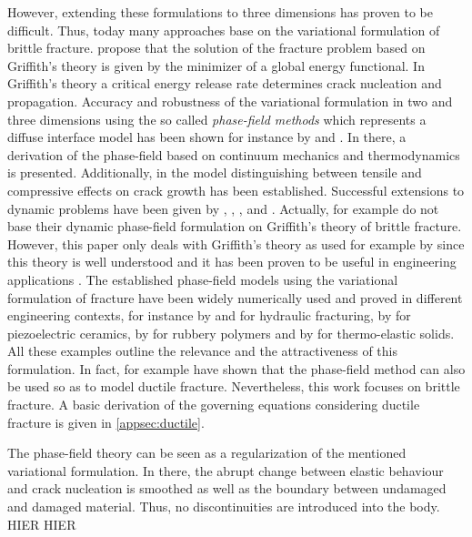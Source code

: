 However, extending these formulations to three dimensions has proven to be difficult. Thus, today many approaches base on the variational formulation of brittle fracture. \citet{02_B_VarBrittle} propose that the solution of the fracture problem based on Griffith's theory is given by the minimizer of a global energy functional. In Griffith's theory a critical energy release rate determines crack nucleation and propagation. Accuracy and robustness of the variational formulation in two and three dimensions using the so called \textit{phase-field methods} which represents a diffuse interface model has been shown for instance by \citet{04_B_VarBrittleProve2} and \citet{03_B_VarBrittleProve1}. In there, a derivation of the phase-field based on continuum mechanics and thermodynamics is presented. Additionally, in \cite{04_B_VarBrittleProve2} the model distinguishing between tensile and compressive effects on crack growth has been established. Successful extensions to dynamic problems have been given by \citet{01_PF_dyn_brittle}, \citet{05_B_dynExtension1}, \citet{06_B_dynExtension2}, \citet{07_B_dynExtension3} and \citet{08_B_dynExtension4}. Actually, for example \citet{10_PH_Mode3} do not base their dynamic phase-field formulation on Griffith's theory of brittle fracture. However, this paper only deals with Griffith's theory as used for example by \citet{08_PF_Gammac2} since this theory is well understood and it has been proven to be useful in engineering applications \citep{01_PF_dyn_brittle}. The established phase-field models using the variational formulation of fracture have been widely numerically used and proved in different engineering contexts, for instance by \citet{11_B_EngProb1} and \citet{12_B_EngProb2} for hydraulic fracturing, by \citet{13_B_EngProb3} for piezoelectric ceramics, by \citet{14_B_EngProb4} for rubbery polymers and by \citet{15_B_EngProb5} for thermo-elastic solids. All these examples outline the relevance and the attractiveness of this formulation. In fact, for example \citet{03_PF_ductile} have shown that the phase-field method can also be used so as to model ductile fracture. Nevertheless, this work focuses on brittle fracture. A basic derivation of the governing equations considering ductile fracture is given in \ref{appsec:ductile}.

The phase-field theory can be seen as a regularization of the mentioned variational formulation. In there, the abrupt change between elastic behaviour and crack nucleation is smoothed as well as the boundary between undamaged and damaged material. Thus, no discontinuities are introduced into the body. HIER HIER

